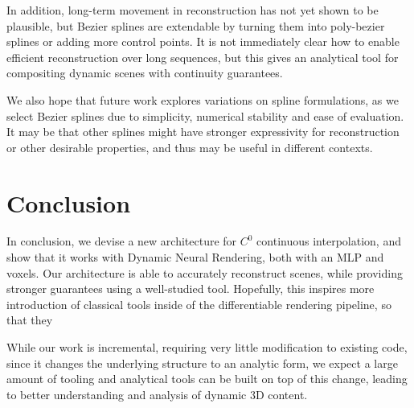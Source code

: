 In addition, long-term movement in reconstruction has not yet shown to be plausible, but Bezier splines are extendable by turning them into poly-bezier splines or adding more control points. It is not immediately clear how to enable efficient reconstruction over long sequences, but this gives an analytical tool for compositing dynamic scenes with continuity guarantees.

We also hope that future work explores variations on spline formulations, as we select
Bezier splines due to simplicity, numerical stability and ease of evaluation. It may be that other splines might have stronger expressivity for reconstruction or other desirable properties, and thus may be useful in different contexts.

\section*{Conclusion}

In conclusion, we devise a new architecture for $C^0$ continuous interpolation, and show that it works with Dynamic Neural Rendering, both with an MLP and voxels.
Our architecture is able to accurately reconstruct scenes, while providing stronger guarantees using a well-studied tool. Hopefully, this inspires more introduction of classical tools
inside of the differentiable rendering pipeline, so that they

While our work is incremental, requiring very little modification to existing code, since it changes the underlying structure to an analytic form, we expect a large amount of tooling and analytical tools can be built on top of this change, leading to better understanding and analysis of dynamic 3D content.

\iffalse
\section*{Acknowledgements}

Thanks to Elliot Cuzzillo and Seung-Hwan Baek for helping proofread this work.
\fi
